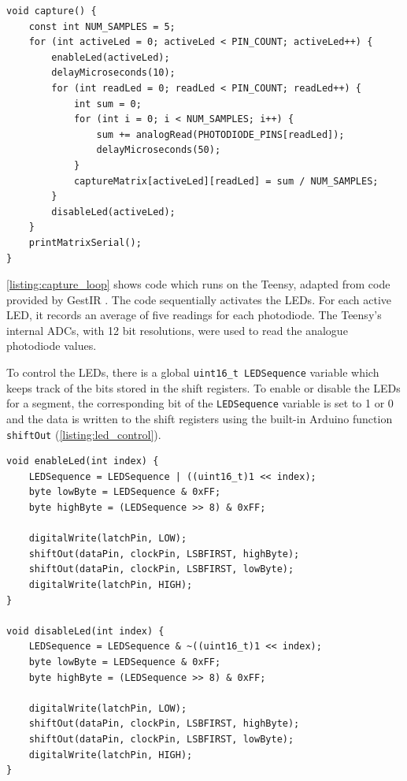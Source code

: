 \documentclass[ oneside,%
                    author={Jack Jarvis},
                    degree={BSc},
                     title={FlexIR: Flexible PCB Wristbands for Infrared Based Gesture Recognition},
                    unit={COMS30045},
                    subtitle={Investigating the Effect of LED Viewing Angle on Gesture Classification in Infrared Sensing Systems}]{dissertation}
\begin{document}
\begin{listing}[ht]
\begin{verbatim}
void capture() {
    const int NUM_SAMPLES = 5;
    for (int activeLed = 0; activeLed < PIN_COUNT; activeLed++) {
        enableLed(activeLed);
        delayMicroseconds(10);
        for (int readLed = 0; readLed < PIN_COUNT; readLed++) {
            int sum = 0;
            for (int i = 0; i < NUM_SAMPLES; i++) {
                sum += analogRead(PHOTODIODE_PINS[readLed]);
                delayMicroseconds(50);
            }
            captureMatrix[activeLed][readLed] = sum / NUM_SAMPLES;
        }
        disableLed(activeLed);
    }
    printMatrixSerial();
}
\end{verbatim}
\caption{Microcontroller code to flash LEDs and read photodiode values \cite{diamand2025}}
\label{listing:capture_loop}
\end{listing}

\cref{listing:capture_loop} shows code which runs on the Teensy, adapted from code provided by GestIR \cite{diamand2025}. The code sequentially activates the LEDs. For each active LED, it records an average of five readings for each photodiode. The Teensy's internal ADCs, with 12 bit resolutions, were used to read the analogue photodiode values.

To control the LEDs, there is a global \texttt{uint16_t LEDSequence} variable which keeps track of the bits stored in the shift registers. To enable or disable the LEDs for a segment, the corresponding bit of the \texttt{LEDSequence} variable is set to 1 or 0 and the data is written to the shift registers using the built-in Arduino function \texttt{shiftOut} (\cref{listing:led_control}).

\begin{listing}[ht]
\begin{verbatim}
void enableLed(int index) {
    LEDSequence = LEDSequence | ((uint16_t)1 << index);
    byte lowByte = LEDSequence & 0xFF;
    byte highByte = (LEDSequence >> 8) & 0xFF;

    digitalWrite(latchPin, LOW);
    shiftOut(dataPin, clockPin, LSBFIRST, highByte);
    shiftOut(dataPin, clockPin, LSBFIRST, lowByte);
    digitalWrite(latchPin, HIGH);
}

void disableLed(int index) {
    LEDSequence = LEDSequence & ~((uint16_t)1 << index);
    byte lowByte = LEDSequence & 0xFF;
    byte highByte = (LEDSequence >> 8) & 0xFF;

    digitalWrite(latchPin, LOW);
    shiftOut(dataPin, clockPin, LSBFIRST, highByte);
    shiftOut(dataPin, clockPin, LSBFIRST, lowByte);
    digitalWrite(latchPin, HIGH);
}
\end{verbatim}
\caption{LEDs are activated or deactivated by setting the corresponding bit in the shift register to 1 or 0.}
\label{listing:led_control}
\end{listing}
\end{document}
